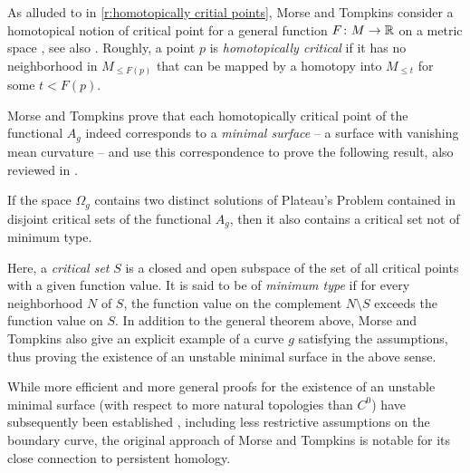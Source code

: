 As alluded to in \cref{r:homotopically critial points}, Morse and Tompkins consider a homotopical notion of critical point for a general function $F \colon M \to \mathbb{R}$ on a metric space \cite[p.~445]{Morse.1939}, see also \cite{Morse.1943}.
Roughly, a point $p$ is \emph{homotopically critical} if it has no neighborhood in $M_{\leq F(p)}$ that can be mapped by a homotopy into $M_{\leq t}$ for some $t<F(p)$.

Morse and Tompkins prove \cite[p.~464]{Morse.1939} that each homotopically critical point of the functional $A_g$ indeed corresponds to
%
a \emph{minimal surface} -- a surface with vanishing mean curvature -- and use this correspondence to prove the following result, also reviewed in \cite[Theorem II.6.10]{Struwe.1988}.

\begin{thm}
	If the space $\Omega_g$ contains two distinct solutions of Plateau's Problem contained in disjoint critical sets of the functional $A_g$, then it also contains a critical set not of minimum type.
\end{thm}
Here, a \emph{critical set} $S$ is a closed and open subspace of the set of all critical points with a given function value.
It is said to be of \emph{minimum type} if for every neighborhood $N$ of $S$, the function value on the complement $N \setminus S$ exceeds the function value on $S$.
In addition to the general theorem above, Morse and Tompkins also give an explicit example of a curve $g$ satisfying the assumptions, thus proving the existence of an unstable minimal surface in the above sense.

%

While more efficient and more general proofs for the existence of an unstable minimal surface (with respect to more natural topologies than $C^0$) have subsequently been established \cite{Struwe.1988,Dierkes.2010}, including less restrictive assumptions on the boundary curve, the original approach of Morse and Tompkins is notable for its close connection to persistent homology.


